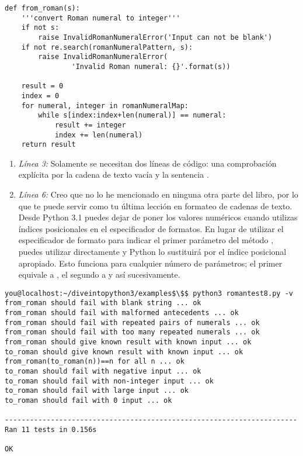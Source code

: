 \noindent\begin{minipage}{\textwidth}
\begin{lstlisting}[mathescape=True]
def from_roman(s):
    '''convert Roman numeral to integer'''
    if not s:
        raise InvalidRomanNumeralError('Input can not be blank')
    if not re.search(romanNumeralPattern, s):
        raise InvalidRomanNumeralError(
                'Invalid Roman numeral: {}'.format(s))

    result = 0
    index = 0
    for numeral, integer in romanNumeralMap:
        while s[index:index+len(numeral)] == numeral:
            result += integer
            index += len(numeral)
    return result
\end{lstlisting}
\end{minipage}

\begin{enumerate}

\item \emph{Línea 3:} Solamente se necesitan dos líneas de código: una comprobación explícita por la cadena de texto vacía y la sentencia .

\item \emph{Línea 6:} Creo que no lo he mencionado en ninguna otra parte del libro, por lo que te puede servir como tu última lección en formateo de cadenas de texto. Desde Python 3.1 puedes dejar de poner los valores numéricos cuando utilizas índices posicionales en el especificador de formatos. En lugar de utilizar el especificador de formato  para indicar el primer parámetro del método , puedes utilizar directamente \codigo{\{\}} y Python lo sustituirá por el índice posicional apropiado. Esto funciona para cualquier número de parámetros; el primer \codigo{\{\}} equivale a , el segundo \codigo{\{\}} a  y así sucesivamente.

\end{enumerate}

\noindent\begin{minipage}{\textwidth}
\begin{lstlisting}[mathescape=True]
you@localhost:~/diveintopython3/examples$\$$ python3 romantest8.py -v
from_roman should fail with blank string ... ok
from_roman should fail with malformed antecedents ... ok
from_roman should fail with repeated pairs of numerals ... ok
from_roman should fail with too many repeated numerals ... ok
from_roman should give known result with known input ... ok
to_roman should give known result with known input ... ok
from_roman(to_roman(n))==n for all n ... ok
to_roman should fail with negative input ... ok
to_roman should fail with non-integer input ... ok
to_roman should fail with large input ... ok
to_roman should fail with 0 input ... ok

----------------------------------------------------------------------
Ran 11 tests in 0.156s

OK
\end{lstlisting}
\end{minipage}

